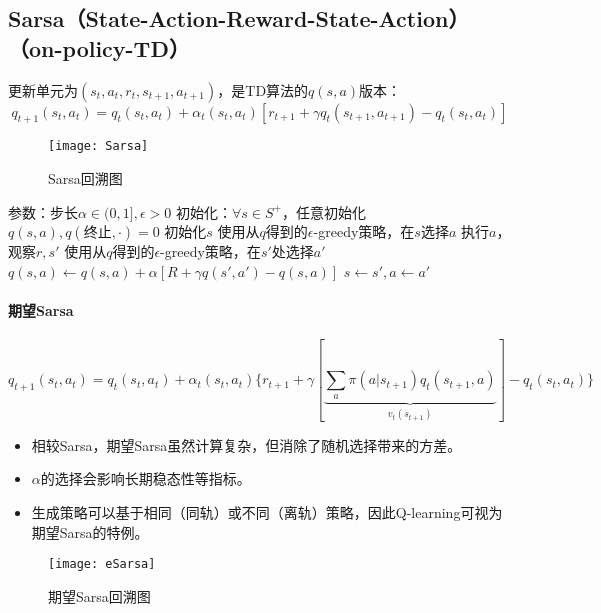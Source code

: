 \documentclass[
12pt, %
a4paper, 
oneside, %
headinclude,footinclude, %
]{scrartcl}
\begin{document}
\subsection[Sarsa]{Sarsa（State-Action-Reward-State-Action）（on-policy-TD）}
更新单元为$ (s_t, a_t, r_t, s_{t + 1}, a_{t + 1}) $，是TD算法的$ q(s, a) $版本：
$$ q_{t + 1}(s_t, a_t) = q_t(s_t, a_t) + \alpha_t(s_t, a_t)[r_{t + 1} + \gamma q_t(s_{t + 1}, a_{t + 1}) - q_t(s_t, a_t)] $$

\begin{figure}[H]
\centering
\texttt{[image: Sarsa]}
\caption{Sarsa回溯图}
\end{figure}
\begin{myalgorithm}
\State 参数：步长$ \alpha \in (0,1], \epsilon > 0 $
\State 初始化：$ \forall s \in S^+ $，任意初始化$ q(s,a), q(\text{终止}, \cdot) = 0 $
\State 初始化$ s $
\State 使用从$ q $得到的$ \epsilon $-greedy策略，在$ s $选择$ a $
\State 执行$ a $，观察$ r, s' $
\State 使用从$ q $得到的$ \epsilon$-greedy策略，在$ s' $处选择$ a' $
\State $ q(s, a) \gets q(s, a) + \alpha [R + \gamma q(s', a') - q(s, a)] $
\State $ s \gets s', a \gets a' $
\EndWhile
\EndFor
\end{myalgorithm}
\paragraph{期望Sarsa}
$$ q_{t + 1}(s_t, a_t) = q_t(s_t, a_t) + \alpha_t(s_t, a_t)\{r_{t + 1} + \gamma[\underbrace{\sum_a \pi(a|s_{t + 1}) q_t(s_{t + 1}, a)}_{v_t(s_{t + 1})}] - q_t(s_t, a_t)\} $$

\noindent
\begin{minipage}{0.7\textwidth}
\begin{itemize}
\item 相较Sarsa，期望Sarsa虽然计算复杂，但消除了随机选择带来的方差。
\item $ \alpha $的选择会影响长期稳态性等指标。
\item 生成策略可以基于相同（同轨）或不同（离轨）策略，因此Q-learning可视为期望Sarsa的特例。
\end{itemize}
\end{minipage}
\begin{minipage}{0.3\textwidth}
\begin{figure}[H]
\centering
\texttt{[image: eSarsa]}
\caption{期望Sarsa回溯图}
\end{figure}
\end{minipage}
\end{document}
